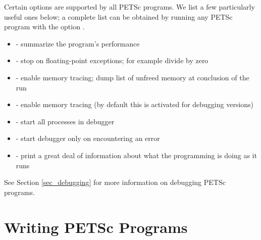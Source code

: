 Certain options are supported by all PETSc programs.  We list a few 
particularly useful ones below; a complete list can be obtained by 
running any PETSc program with the option .
\begin{itemize}
\item {} - summarize the program's performance
\item {} - stop on floating-point exceptions; 
      for example divide by zero
\item {} - enable memory tracing; dump list of unfreed memory 
      at conclusion  of the run
\item {} - enable memory tracing (by default this is 
      activated for debugging versions)
\item {}   
     - start all processes in debugger  
\item {}  
       - start debugger only on encountering an error
\item {} - print a great deal of information about what the programming is doing as it runs
\end{itemize}
See Section \ref{sec_debugging} for more information on debugging PETSc programs.

\section{Writing PETSc Programs}
\label{sec_writing}


